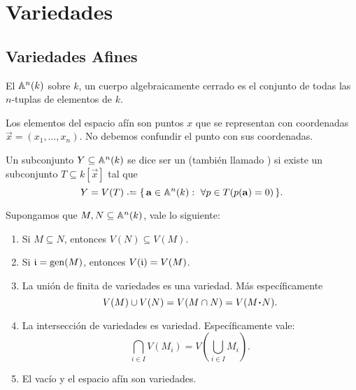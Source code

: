 \documentclass[12pt]{memoir}
\begin{document}

\chapter{Variedades}

\section{Variedades Afines}

\begin{Def}\label{def:espacio-afin}
El  $\mathbb{A}^n(k)$ sobre $k$, un cuerpo algebraicamente cerrado es el conjunto de todas las $n$-tuplas de elementos de $k$.
\end{Def}

Los elementos del espacio afín son puntos $x$ que se representan con coordenadas $\vec x=(x_1,\dots,x_n)$. No debemos confundir el punto con sus coordenadas.

\begin{Def}\label{def:variedad}
   Un subconjunto $Y\subseteq\mathbb{A}^n(k)$ se dice ser un  (también llamado ) si existe un subconjunto $T\subseteq k[\vec x]$ tal que 
   $$Y=V(T)\defeq\set{\vec a\in\bA^n(k):\ \forall p\in T(p(\vec a)=0)}.$$
\end{Def}

\begin{Prop}\label{prop:propiedades-variedades}
  Supongamos que $M,N\subseteq\mathbb{A}^n(k)$, vale lo siguiente:
  \begin{enumerate}
    \item Si $M\subseteq N$, entonces $V(N)\subseteq V(M)$.
    \item Si $\mathfrak{i} =\operatorname{gen}(M)$, entonces $V(\mathfrak{i})=V(M)$.
    \item La unión de finita de variedades es una variedad. Más específicamente 
    $$V(M)\cup V(N)=V(M\cap N)=V(M\.N).$$
    \item La intersección de variedades es variedad. Específicamente vale:
    $$\bigcap_{i\in I}V(M_i)=V\left(\bigcup_{i\in I}M_i\right).$$
    \item El vacío y el espacio afín son variedades.
  \end{enumerate}
\end{Prop}
\end{document}
